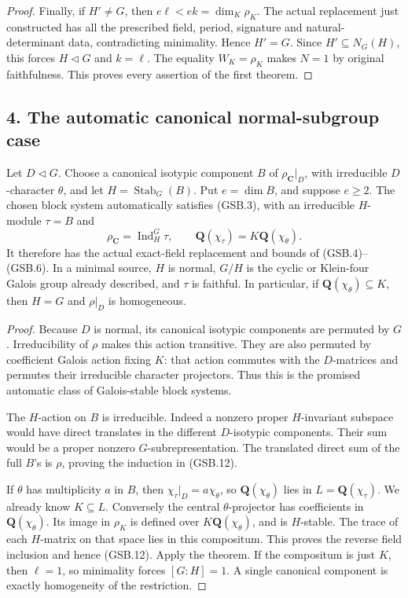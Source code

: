 \begin{proof}
Finally, if \(H'\ne G\), then \(e\ell<ek=\dim_K\rho_K\).
The actual replacement just constructed has all the prescribed
field, period, signature and natural-determinant data, contradicting
minimality. Hence \(H'=G\). Since \(H'\subseteq N_G(H)\), this
forces \(H\triangleleft G\) and \(k=\ell\). The equality
\(W_K=\rho_K\) makes \(N=1\) by original faithfulness. This proves
every assertion of the first theorem.
\end{proof}

\subsection*{4. The automatic canonical normal-subgroup case}

\begin{corollary}
Let \(D\triangleleft G\). Choose a canonical isotypic component
\(B\) of \(\rho_{\mathbf C}|_D\), with irreducible \(D\)-character
\(\theta\), and let \(H=\operatorname{Stab}_G(B)\). Put
\(e=\dim B\), and suppose \(e\ge2\). The chosen block system
automatically satisfies (GSB.3), with an irreducible \(H\)-module
\(\tau=B\) and
\[
 \rho_{\mathbf C}=\operatorname{Ind}_H^G\tau,
 \qquad \mathbf Q(\chi_\tau)=K\mathbf Q(\chi_\theta).
 \tag{GSB.12}
\]
It therefore has the actual exact-field replacement and bounds
of (GSB.4)--(GSB.6). In a minimal source, \(H\) is normal,
\(G/H\) is the cyclic or Klein-four Galois group already described,
and \(\tau\) is faithful. In particular, if
\(\mathbf Q(\chi_\theta)\subseteq K\), then \(H=G\) and
\(\rho|_D\) is homogeneous.
\end{corollary}

\begin{proof}
Because \(D\) is normal, its canonical isotypic components are
permuted by \(G\). Irreducibility of \(\rho\) makes this action
transitive. They are also permuted by coefficient Galois action
fixing \(K\): that action commutes with the \(D\)-matrices and
permutes their irreducible character projectors. Thus this is the
promised automatic class of Galois-stable block systems.

The \(H\)-action on \(B\) is irreducible. Indeed a nonzero proper
\(H\)-invariant subspace would have direct translates in the
different \(D\)-isotypic components. Their sum would be a proper
nonzero \(G\)-subrepresentation. The translated direct sum of
the full \(B\)'s is \(\rho\), proving the induction in (GSB.12).

If \(\theta\) has multiplicity \(a\) in \(B\), then
\(\chi_\tau|_D=a\chi_\theta\), so \(\mathbf Q(\chi_\theta)\)
lies in \(L=\mathbf Q(\chi_\tau)\). We already know \(K\subseteq L\).
Conversely the central \(\theta\)-projector has coefficients in
\(\mathbf Q(\chi_\theta)\). Its image in \(\rho_K\) is defined
over \(K\mathbf Q(\chi_\theta)\), and is \(H\)-stable. The trace
of each \(H\)-matrix on that space lies in this compositum.
This proves the reverse field inclusion and hence (GSB.12).
Apply the theorem. If the compositum is just \(K\), then \(\ell=1\),
so minimality forces \([G:H]=1\). A single canonical component
is exactly homogeneity of the restriction.
\end{proof}

